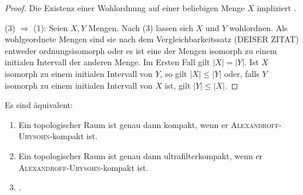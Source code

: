 \begin{proof}
  Die Existenz einer Wohlordnung auf einer beliebigen Menge $X$ impliziert \AC.

  (3) $\Rightarrow$ (1):
  Seien $X,Y$ Mengen. Nach (3) lassen sich $X$ und $Y$ wohlordnen.
  Als wohlgeordnete Mengen sind sie nach dem Vergleichbarkeitssatz (DEISER ZITAT) entweder ordnungsisomorph oder es ist eine der Mengen isomorph zu einem initialen Intervall der anderen Menge.
  Im Ersten Fall gilt $|X| = |Y|$.
  Ist $X$ isomorph zu einem initialen Intervall von $Y$, so gilt $|X| \leq |Y|$ oder, falls $Y$ isomorph zu einem initialen Intervall von $X$ ist, gilt $|Y| \leq |X|$.
\end{proof}

\begin{thm}
  \label{thm:alexandroffUrysohnCompactAC}
  Es sind äquivalent:
  \begin{enumerate}[(1)]
    \item Ein topologischer Raum ist genau dann kompakt, wenn er \textsc{Alexandroff}-\textsc{Urysohn}-kompakt ist.
    \item Ein topologischer Raum ist genau dann ultrafilterkompakt, wenn er \textsc{Alexandroff}-\textsc{Urysohn}-kompakt ist.
    \item \AC.
  \end{enumerate}
\end{thm}

